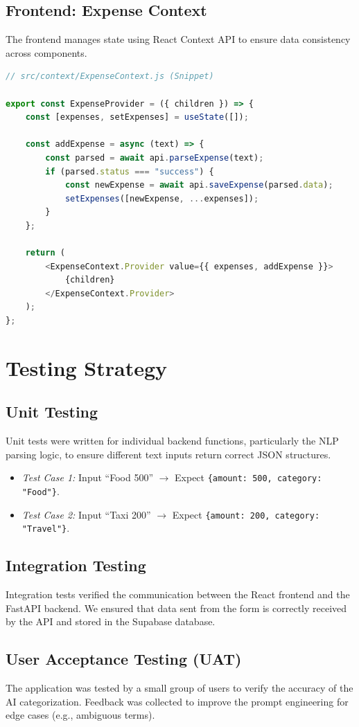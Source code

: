 \subsection{Frontend: Expense Context}
The frontend manages state using React Context API to ensure data consistency across components.

\begin{lstlisting}[language=JavaScript, caption=React Context for Expenses]
// src/context/ExpenseContext.js (Snippet)

export const ExpenseProvider = ({ children }) => {
    const [expenses, setExpenses] = useState([]);

    const addExpense = async (text) => {
        const parsed = await api.parseExpense(text);
        if (parsed.status === "success") {
            const newExpense = await api.saveExpense(parsed.data);
            setExpenses([newExpense, ...expenses]);
        }
    };

    return (
        <ExpenseContext.Provider value={{ expenses, addExpense }}>
            {children}
        </ExpenseContext.Provider>
    );
};
\end{lstlisting}

\section{Testing Strategy}

\subsection{Unit Testing}
Unit tests were written for individual backend functions, particularly the NLP parsing logic, to ensure different text inputs return correct JSON structures.
\begin{itemize}
    \item \textit{Test Case 1:} Input ``Food 500'' $\rightarrow$ Expect \texttt{\{amount: 500, category: "Food"\}}.
    \item \textit{Test Case 2:} Input ``Taxi 200'' $\rightarrow$ Expect \texttt{\{amount: 200, category: "Travel"\}}.
\end{itemize}

\subsection{Integration Testing}
Integration tests verified the communication between the React frontend and the FastAPI backend. We ensured that data sent from the form is correctly received by the API and stored in the Supabase database.

\subsection{User Acceptance Testing (UAT)}
The application was tested by a small group of users to verify the accuracy of the AI categorization. Feedback was collected to improve the prompt engineering for edge cases (e.g., ambiguous terms).
